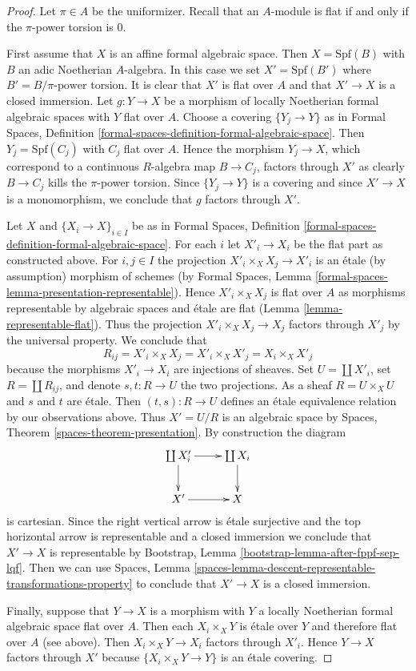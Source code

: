 \documentclass{stacks-project}
\theoremstyle{plain}
\theoremstyle{definition}
\theoremstyle{remark}
\numberwithin{equation}{subsection}
\begin{document}
\begin{proof}
Let $\pi \in A$ be the uniformizer. Recall that an $A$-module
is flat if and only if the $\pi$-power torsion is $0$.

\medskip\noindent
First assume that $X$ is an affine formal algebraic space.
Then $X = \text{Spf}(B)$ with $B$ an adic Noetherian $A$-algebra.
In this case we set $X' = \text{Spf}(B')$ where
$B' = B/\pi\text{-power torsion}$. It is clear that $X'$ is flat
over $A$ and that $X' \to X$ is a closed immersion.
Let $g : Y \to X$ be a morphism of locally Noetherian formal algebraic spaces
with $Y$ flat over $A$. Choose a covering $\{Y_j \to Y\}$ as in
Formal Spaces, Definition
\ref{formal-spaces-definition-formal-algebraic-space}.
Then $Y_j = \text{Spf}(C_j)$ with $C_j$ flat over $A$.
Hence the morphism $Y_j \to X$, which correspond to a continuous
$R$-algebra map $B \to C_j$, factors through $X'$ as clearly
$B \to C_j$ kills the $\pi$-power torsion.
Since $\{Y_j \to Y\}$ is a covering and since $X' \to X$
is a monomorphism, we conclude that $g$ factors through $X'$.

\medskip\noindent
Let $X$ and $\{X_i \to X\}_{i \in I}$ be as in
Formal Spaces, Definition
\ref{formal-spaces-definition-formal-algebraic-space}.
For each $i$ let $X'_i \to X_i$ be the flat part as
constructed above. For $i, j \in I$ the projection
$X'_i \times_X X_j \to X'_i$ is an \'etale (by assumption)
morphism of schemes (by Formal Spaces, Lemma
\ref{formal-spaces-lemma-presentation-representable}).
Hence $X'_i \times_X X_j$ is flat over $A$ as morphisms
representable by algebraic spaces and \'etale
are flat (Lemma \ref{lemma-representable-flat}).
Thus the projection $X'_i \times_X X_j \to X_j$ factors
through $X'_j$ by the universal property. We conclude that
$$
R_{ij} = X'_i \times_X X_j = X'_i \times_X X'_j = X_i \times_X X'_j
$$
because the morphisms $X'_i \to X_i$ are injections of sheaves.
Set $U = \coprod X'_i$, set
$R = \coprod R_{ij}$, and denote $s, t : R \to U$ the two
projections. As a sheaf $R = U \times_X U$ and $s$ and $t$
are \'etale. Then $(t, s) : R \to U$ defines an \'etale equivalence
relation by our observations above. Thus $X' = U/R$ is an
algebraic space by Spaces, Theorem \ref{spaces-theorem-presentation}.
By construction the diagram
$$
\xymatrix{
\coprod X'_i \ar[r] \ar[d] & \coprod X_i \ar[d] \\
X' \ar[r] & X
}
$$
is cartesian. Since the right vertical arrow is \'etale surjective
and the top horizontal arrow is representable and a closed immersion
we conclude that $X' \to X$ is representable by
Bootstrap, Lemma \ref{bootstrap-lemma-after-fppf-sep-lqf}.
Then we can use Spaces, Lemma
\ref{spaces-lemma-descent-representable-transformations-property}
to conclude that $X' \to X$ is a closed immersion.

\medskip\noindent
Finally, suppose that $Y \to X$ is a morphism with
$Y$ a locally Noetherian formal algebraic space flat over $A$.
Then each $X_i \times_X Y$ is \'etale over $Y$ and
therefore flat over $A$ (see above).
Then $X_i \times_X Y \to X_i$ factors through $X'_i$.
Hence $Y \to X$ factors through $X'$ because
$\{X_i \times_X Y \to Y\}$ is an \'etale covering.
\end{proof}
\end{document}
